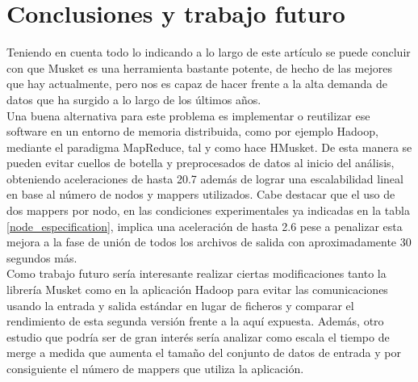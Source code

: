 \documentclass[conference]{IEEEtran}
\begin{document}
\section{Conclusiones y trabajo futuro}
Teniendo en cuenta todo lo indicando a lo largo de este artículo se puede concluir con que Musket es una herramienta bastante potente, de hecho de las mejores que hay actualmente, pero nos es capaz de hacer frente a la alta demanda de datos que ha surgido a lo largo de los últimos años.\\
Una buena alternativa para este problema es implementar o reutilizar ese software en un entorno de memoria distribuida, como por ejemplo Hadoop, mediante el paradigma MapReduce, tal y como hace HMusket. De esta manera se pueden evitar cuellos de botella y preprocesados de datos al inicio del análisis, obteniendo aceleraciones de hasta 20.7 además de lograr una escalabilidad lineal en base al número de nodos y mappers utilizados. Cabe destacar que el uso de dos mappers por nodo, en las condiciones experimentales ya indicadas en la tabla \ref{node_especification}, implica una aceleración de hasta 2.6 pese a penalizar esta mejora a la fase de unión de todos los archivos de salida con aproximadamente 30 segundos más.\\ 

Como trabajo futuro sería interesante realizar ciertas modificaciones tanto la librería Musket como en la aplicación Hadoop para evitar las comunicaciones usando la entrada y salida estándar en lugar de ficheros y comparar el rendimiento de esta segunda versión frente a la aquí expuesta. Además, otro estudio que podría ser de gran interés sería analizar como escala el tiempo de merge a medida que aumenta el tamaño del conjunto de datos de entrada y por consiguiente el número de mappers que utiliza la aplicación.\\




\end{document}
